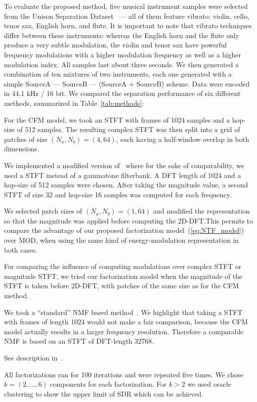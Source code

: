 To evaluate the proposed method, five musical instrument samples were selected from the Unison Separation Dataset~\cite{oss_unison} --- all of them feature vibrato: 
violin, cello, tenor sax, English horn, and flute. 
It is important to note that vibrato techniques differ between these instruments: 
whereas the English horn and the flute only produce a very subtle modulation, the violin and tenor sax have powerful frequency modulations with a higher modulation frequency as well as a higher modulation index. 
All samples last about three seconds. 
We then generated a combination of ten mixtures of two instruments, each one generated with a simple SourceA --- SourceB --- (SourceA + SourceB) scheme. Data were encoded in 44.1 kHz / 16 bit.
We compared the separation performance of six different methods, summarized in Table~\ref{tab:methods}:
\begin{description}[style=unboxed,leftmargin=0cm]
\item[CFM] For the CFM model, we took an \acs{STFT} with frames of 1024 samples and a hop-size of 512 samples. The resulting complex \acs{STFT} was then split into a grid of patches of size $(N_a, N_b) = (4, 64)$, each having a half-window overlap in both dimensions.
\item[MOD] We implemented a modified version of~\cite{barker13} where for the sake of comparability, we used a \acs{STFT} instead of a gammatone filterbank. A DFT length of 1024 and a hop-size of 512 samples were chosen. After taking the magnitude value, a second \acs{STFT} of size 32 and hop-size 16 samples was computed for each frequency.
\item[CFMMOD] We selected patch sizes of $(N_a, N_b) = (1, 64)$ and modified the representation so that the magnitude was applied before computing the 2D-DFT.\@ This permits to compare the advantage of our proposed factorization model~(\ref{eq:NTF_model}) over MOD, when using the same kind of energy-modulation representation in both cases.
\item[CFMM] For comparing the influence of computing modulations over complex \acs{STFT} or magnitude \acs{STFT}, we tried our factorization model when the magnitude of the \acs{STFT} is taken before 2D-DFT, with patches of the same size as for the CFM method.
\item[NMF] We took a ``standard'' \acs{NMF} based method~\cite{virtanen07}. We highlight that taking a \acs{STFT} with frames of length 1024 would not make a fair comparison, because the CFM model actually results in a larger frequency resolution. Therefore a comparable \acs{NMF} is based on an \acs{STFT} of DFT-length 32768.
\item[HR-NMF] See description in~\cite{magron15a}.
\end{description}
All factorizations ran for 100 iterations and were repeated five times. We chose $k=(2,\ldots,6)$ components for each factorization. For $k > 2$ we used oracle clustering to show the upper limit of SDR which can be achieved.

